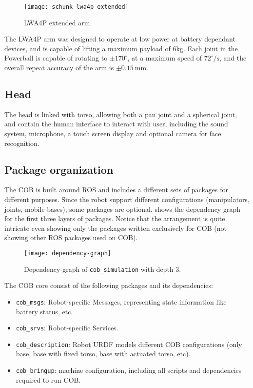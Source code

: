 \begin{figure}[!ht]
    \centering
    \texttt{[image: schunk\_lwa4p\_extended]}
    \caption{LWA4P extended arm.}
    \label{fig:schunk_lwa4p_extended}
\end{figure}

The LWA4P arm was designed to operate at low power at battery dependant devices, and is capable of lifting a maximum payload of 6kg. Each joint in the Powerball is capable of rotating to $\pm 170^\circ$, at a maximum speed of $72^\circ /\text{s}$, and the overall repeat accuracy of the arm is $\pm 0.15 \ \text{mm}$.


\subsection{Head}

The head is linked with torso, allowing both a pan joint and a spherical joint, and contain the human interface to interact with user, including the sound system, microphone, a touch screen display and optional camera for face recognition.


\subsection{Package organization}

The COB is built around ROS and includes a different sets of packages for different purposes. Since the robot support different configurations (manipulators, joints, mobile bases), some packages are optional.  shows the dependency graph for the first three layers of packages. Notice that the arrangement is quite intricate even showing only the packages written exclusively for COB (not showing other ROS packages used on COB).

\begin{figure}[!ht]
\centering
\texttt{[image: dependency-graph]}
\caption{Dependency graph of \texttt{cob\_simulation} with depth 3.}
\label{fig:dependency-graph}
\end{figure}


The COB core consist of the following packages and its dependencies:

\begin{itemize}
\item \texttt{cob\_msgs}: Robot-specific Messages, representing state information like battery status, etc.
\item \texttt{cob\_srvs}: Robot-specific Services.
\item \texttt{cob\_description}: Robot URDF models different COB configurations (only base, base with fixed torso, base with actuated torso, etc).
\item \texttt{cob\_bringup}: machine configuration, including all scripts and dependencies required to run COB.
\end{itemize}

